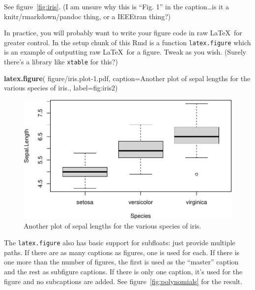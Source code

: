 \documentclass[a4paper,conference]{IEEEtran}
\newenvironment{Shaded}{\begin{snugshade}}{\end{snugshade}}
\newcommand{\AttributeTok}[1]{\textcolor[rgb]{0.13,0.29,0.53}{#1}}
\newcommand{\FunctionTok}[1]{\textcolor[rgb]{0.13,0.29,0.53}{\textbf{#1}}}
\newcommand{\NormalTok}[1]{#1}
\newcommand{\StringTok}[1]{\textcolor[rgb]{0.31,0.60,0.02}{#1}}
\begin{document}
See figure~\ref{fig:iris}. (I am unsure why this is ``Fig. 1'' in the
caption\ldots is it a knitr/rmarkdown/pandoc thing, or a IEEEtran
thing?)

In practice, you will probably want to write your figure code in raw
\LaTeX~for greater control. In the setup chunk of this Rmd is a function
\texttt{latex.figure} which is an example of outputting raw \LaTeX~for a
figure. Tweak as you wish. (Surely there's a library like
\texttt{xtable} for this?)

\begin{Shaded}
\begin{Highlighting}[]
\FunctionTok{latex.figure}\NormalTok{(}
  \StringTok{\textquotesingle{}figure/iris.plot{-}1.pdf\textquotesingle{}}\NormalTok{,}
  \AttributeTok{caption=}\StringTok{\textquotesingle{}Another plot of sepal lengths}
\StringTok{           for the various species of iris.\textquotesingle{}}\NormalTok{,}
  \AttributeTok{label=}\StringTok{\textquotesingle{}fig:iris2\textquotesingle{}}\NormalTok{)}
\end{Highlighting}
\end{Shaded}

\begin{figure}[!t]%
\centering%
\includegraphics[width=\columnwidth]{figure/iris.plot-1.pdf}%
\caption{Another plot of sepal lengths
           for the various species of iris.}%
\label{fig:iris2}%
\end{figure}

The \texttt{latex.figure} also has basic support for subfloats: just
provide multiple paths. If there are as many captions as figures, one is
used for each. If there is one more than the number of figures, the
first is used as the ``master'' caption and the rest as subfigure
captions. If there is only one caption, it's used for the figure and no
subcaptions are added. See figure~\ref{fig:polynomials} for the result.
\end{document}
